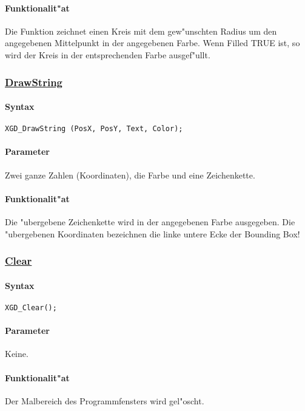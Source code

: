 \paragraph{Funktionalit"at}
Die Funktion zeichnet einen Kreis mit dem gew"unschten Radius um den
angegebenen Mittelpunkt in der angegebenen Farbe. Wenn Filled TRUE ist,
so wird der Kreis in der entsprechenden Farbe ausgef"ullt.


\subsubsection{\underline{DrawString}}

\paragraph{Syntax}
\begin{verbatim}
XGD_DrawString (PosX, PosY, Text, Color);
\end{verbatim}

\paragraph{Parameter}
Zwei ganze Zahlen (Koordinaten), die Farbe und eine Zeichenkette.

\paragraph{Funktionalit"at}
Die "ubergebene Zeichenkette wird in der angegebenen Farbe ausgegeben.
Die "ubergebenen Koordinaten bezeichnen die linke untere Ecke der Bounding
Box!


\subsubsection{\underline{Clear}}

\paragraph{Syntax}
\begin{verbatim}
XGD_Clear();
\end{verbatim}

\paragraph{Parameter}
Keine.

\paragraph{Funktionalit"at}
Der Malbereich des Programmfensters wird gel"oscht.

